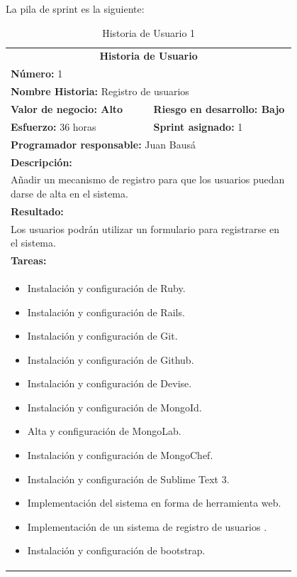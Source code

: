 	La pila de sprint es la siguiente:
	
	\begin{table}[H]
	  \centering 
	  \begin{tabular}{p{0.4\linewidth}p{0.4\linewidth}}
	    \toprule
	    \multicolumn{2}{c}{\cellcolor{black!30}\textbf{Historia de Usuario}} 													\\
		\multicolumn{2}{l}{\cellcolor{gray!25}\textbf{Número: }1}																\\
		\multicolumn{2}{l}{\textbf{Nombre Historia: } Registro de usuarios}													\\
		\cellcolor{gray!25}\textbf{Valor de negocio: Alto}	&	\cellcolor{gray!25}\textbf{Riesgo en desarrollo: Bajo}			\\
		\textbf{Esfuerzo:} 36 horas				&	\textbf{Sprint asignado: }1 												\\
		\multicolumn{2}{l}{\cellcolor{gray!25}\textbf{Programador responsable: }Juan Bausá}									\\
		\multicolumn{2}{l}{\textbf{Descripción:}}                                                     						\\
		\multicolumn{2}{l}{	Añadir un mecanismo de registro para que los usuarios puedan darse de alta en el sistema.} 		\\
		\multicolumn{2}{l}{\cellcolor{gray!25}\textbf{Resultado:}}																\\
		\multicolumn{2}{l}{Los usuarios podrán utilizar un formulario para registrarse en el sistema.} 						\\
		\multicolumn{2}{l}{\textbf{Tareas:}}																					\\
		\multicolumn{2}{l}{
			\begin{minipage}{5in}
	    		\vskip 4pt
	    		\begin{itemize}
					\item Instalación y configuración de Ruby.
					\item Instalación y configuración de Rails.
					\item Instalación y configuración de Git.
					\item Instalación y configuración de Github.
					\item Instalación y configuración de Devise.
					\item Instalación y configuración de MongoId.
					\item Alta y configuración de MongoLab.
					\item Instalación y configuración de MongoChef.
					\item Instalación y configuración de Sublime Text 3.
					\item Implementación del sistema en forma de herramienta web.
					\item Implementación de un sistema de registro de usuarios	.
					\item Instalación y configuración de bootstrap.
				\end{itemize}
			  	\vskip 4pt
		 	\end{minipage}
		} \\																				
	    \hline
	  \end{tabular}
	  \caption{Historia de Usuario 1}
	\end{table}
